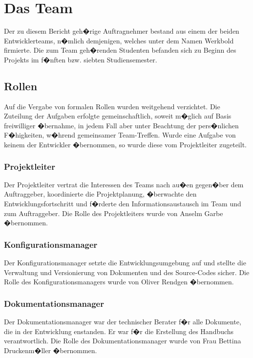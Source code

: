 \documentclass[a4paper,titlepage,12pt,ngerman]{scrbook}
\begin{document}
\section{Das Team}

Der zu diesem Bericht geh�rige Auftragnehmer bestand aus einem der beiden
Entwicklerteams, n�mlich demjenigen, welches unter dem Namen Werkbold firmierte.
Die zum Team geh�renden Studenten befanden sich zu Beginn des Projekts im f�nften bzw. siebten Studiensemester. 


\subsection{Rollen}

Auf die Vergabe von formalen Rollen wurden weitgehend verzichtet. 
Die Zuteilung der Aufgaben erfolgte
gemeinschaftlich, soweit m�glich auf Basis freiwilliger �bernahme,
in jedem Fall aber unter Beachtung der pers�nlichen F�higkeiten, 
w�hrend gemeinsamer Team-Treffen. Wurde eine Aufgabe von keinem der
Entwickler �bernommen, so wurde diese vom Projektleiter zugeteilt.


\subsubsection{Projektleiter}

Der Projektleiter vertrat die Interessen des Teams nach au�en gegen�ber 
dem Auftraggeber, koordinierte die Projektplanung, �berwachte den
Entwicklungsfortschritt und f�rderte den Informationsaustausch im
Team und zum Auftraggeber. Die Rolle des Projektleiters wurde von
Anselm Garbe �bernommen.

\subsubsection{Konfigurationsmanager}

Der Konfigurationsmanager setzte die
Entwicklungsumgebung auf und stellte die Verwaltung und
Versionierung von Dokumenten und des Source-Codes sicher. Die Rolle des
Konfigurationsmanagers wurde von Oliver Rendgen �bernommen.

\subsubsection{Dokumentationsmanager}

Der Dokumentationsmanager war der
technischer Berater f�r alle Dokumente, die in der Entwicklung
enstanden. Er war f�r die Erstellung des Handbuchs verantwortlich.
Die Rolle des Dokumentationsmanager wurde von Frau Bettina Druckenm�ller 
�bernommen.
\end{document}
